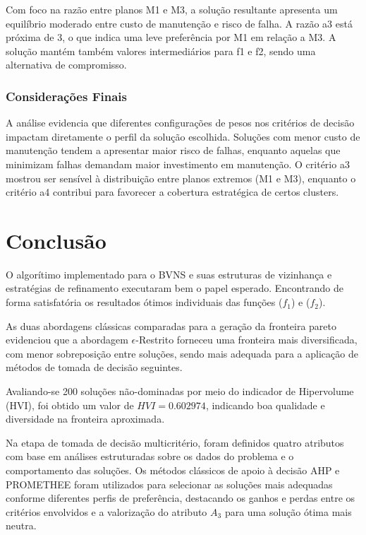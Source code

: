 \documentclass[conference]{IEEEtran}
\begin{document}
Com foco na razão entre planos M1 e M3, a solução resultante apresenta um equilíbrio moderado entre custo de manutenção e risco de falha. A razão a3 está próxima de 3, o que indica uma leve preferência por M1 em relação a M3. A solução mantém também valores intermediários para f1 e f2, sendo uma alternativa de compromisso.

\subsubsection{Considerações Finais}

A análise evidencia que diferentes configurações de pesos nos critérios de decisão impactam diretamente o perfil da solução escolhida. Soluções com menor custo de manutenção tendem a apresentar maior risco de falhas, enquanto aquelas que minimizam falhas demandam maior investimento em manutenção. O critério a3 mostrou ser sensível à distribuição entre planos extremos (M1 e M3), enquanto o critério a4 contribui para favorecer a cobertura estratégica de certos clusters.

\section{Conclusão}

O algorítimo implementado para o BVNS e suas estruturas de vizinhança e estratégias de refinamento executaram bem o papel esperado. Encontrando de forma satisfatória os resultados ótimos individuais das funções ($f_1$) e ($f_2$).

As duas abordagens clássicas comparadas para a geração da fronteira pareto evidenciou que a abordagem $\epsilon$-Restrito forneceu uma fronteira mais diversificada, com menor sobreposição entre soluções, sendo mais adequada para a aplicação de métodos de tomada de decisão seguintes.

Avaliando-se 200 soluções não-dominadas por meio do indicador de Hipervolume (HVI), foi obtido um valor de $HVI = 0.602974$, indicando boa qualidade e diversidade na fronteira aproximada.

Na etapa de tomada de decisão multicritério, foram definidos quatro atributos com base em análises estruturadas sobre os dados do problema e o comportamento das soluções. Os métodos clássicos de apoio à decisão AHP e PROMETHEE foram utilizados para selecionar as soluções mais adequadas conforme diferentes perfis de preferência, destacando os ganhos e perdas entre os critérios envolvidos e a valorização do atributo $A_3$ para uma solução ótima mais neutra.
\end{document}
